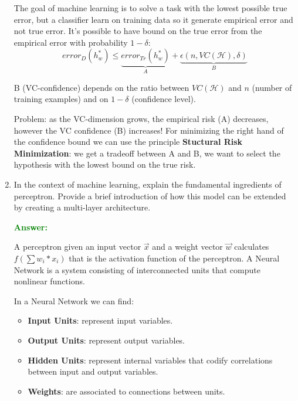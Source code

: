 \documentclass[12pt]{article}
\begin{document}
\begin{enumerate}[label=\textbf{ML.\arabic*}]
    The goal of machine learning is to solve a task with the lowest possible true error, but a classifier learn on training data so 
    it generate empirical error and not true error.
    It's possible to have bound on the true error from the empirical error with probability $1-\delta$:
    \begin{equation}\label{eq:confidence_interval}
        error_D(h^*_w) \leq \underbrace{error_{Tr}(h^*_w)}_A + \underbrace{\epsilon(n,VC(\mathcal{H}),\delta)}_B
    \end{equation}

    B (VC-confidence) depends on the ratio between $VC(\mathcal{H})$ and $n$ (number of training examples) and on $1- \delta$ (confidence level).

    Problem: as the VC-dimension grows, the empirical risk (A) decreases, however the VC confidence (B) increases!
    For minimizing the right hand of the confidence bound we can use the principle \textbf{Stuctural Risk Minimization}:
    we get a tradeoff between A and B, we want to select the hypothesis with the lowest bound on the true risk.



    \item In the context of machine learning, explain the fundamental ingredients of perceptron.
    Provide a brief introduction of how this model can be extended by creating a multi-layer architecture.

    \textcolor{green}{\textbf{Answer:}}

    A perceptron given an input vector $\vec{x}$ and a weight vector $\vec{w}$ calculates $f(\sum{w_i*x_i})$ that is the activation function of the perceptron.
    A Neural Network is a system consisting of interconnected units that compute nonlinear functions.

    In a Neural Network we can find:
    \begin{itemize}
        \item \textbf{Input Units}: represent input variables.
        \item \textbf{Output Units}: represent output variables.
        \item \textbf{Hidden Units}: represent internal variables that codify correlations between input and output variables.
        \item \textbf{Weights}: are associated to connections between units.
    \end{itemize}


\end{enumerate}
\end{document}
